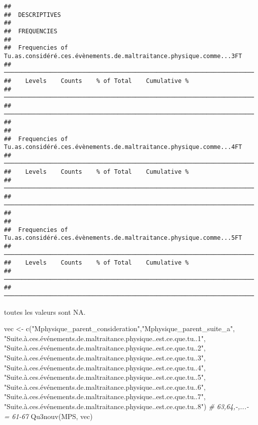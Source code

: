 \documentclass[
]{article}
\newenvironment{Shaded}{\begin{snugshade}}{\end{snugshade}}
\newcommand{\CommentTok}[1]{\textcolor[rgb]{0.56,0.35,0.01}{\textit{#1}}}
\newcommand{\FunctionTok}[1]{\textcolor[rgb]{0.00,0.00,0.00}{#1}}
\newcommand{\NormalTok}[1]{#1}
\newcommand{\OtherTok}[1]{\textcolor[rgb]{0.56,0.35,0.01}{#1}}
\newcommand{\StringTok}[1]{\textcolor[rgb]{0.31,0.60,0.02}{#1}}
\begin{document}
\begin{verbatim}
## 
##  DESCRIPTIVES
## 
##  FREQUENCIES
## 
##  Frequencies of Tu.as.considéré.ces.évènements.de.maltraitance.physique.comme...3FT 
##  ────────────────────────────────────────────────────────────────────────────────── 
##    Levels    Counts    % of Total    Cumulative %   
##  ────────────────────────────────────────────────────────────────────────────────── 
##  ────────────────────────────────────────────────────────────────────────────────── 
## 
## 
##  Frequencies of Tu.as.considéré.ces.évènements.de.maltraitance.physique.comme...4FT 
##  ────────────────────────────────────────────────────────────────────────────────── 
##    Levels    Counts    % of Total    Cumulative %   
##  ────────────────────────────────────────────────────────────────────────────────── 
##  ────────────────────────────────────────────────────────────────────────────────── 
## 
## 
##  Frequencies of Tu.as.considéré.ces.évènements.de.maltraitance.physique.comme...5FT 
##  ────────────────────────────────────────────────────────────────────────────────── 
##    Levels    Counts    % of Total    Cumulative %   
##  ────────────────────────────────────────────────────────────────────────────────── 
##  ──────────────────────────────────────────────────────────────────────────────────
\end{verbatim}

toutes les valeurs sont NA.

\begin{Shaded}
\begin{Highlighting}[]
\NormalTok{vec }\OtherTok{\textless{}{-}} \FunctionTok{c}\NormalTok{(}\StringTok{"Mphysique\_parent\_consideration"}\NormalTok{,}\StringTok{"Mphysique\_parent\_suite\_a"}\NormalTok{,}
         \StringTok{"Suite.à.ces.événements.de.maltraitance.physique..est.ce.que.tu..1"}\NormalTok{,}
         \StringTok{"Suite.à.ces.événements.de.maltraitance.physique..est.ce.que.tu..2"}\NormalTok{,}
         \StringTok{"Suite.à.ces.événements.de.maltraitance.physique..est.ce.que.tu..3"}\NormalTok{,}
         \StringTok{"Suite.à.ces.événements.de.maltraitance.physique..est.ce.que.tu..4"}\NormalTok{,}
         \StringTok{"Suite.à.ces.événements.de.maltraitance.physique..est.ce.que.tu..5"}\NormalTok{,}
         \StringTok{"Suite.à.ces.événements.de.maltraitance.physique..est.ce.que.tu..6"}\NormalTok{,}
         \StringTok{"Suite.à.ces.événements.de.maltraitance.physique..est.ce.que.tu..7"}\NormalTok{,}
         \StringTok{"Suite.à.ces.événements.de.maltraitance.physique..est.ce.que.tu..8"}\NormalTok{)}
\CommentTok{\# 63,64,{-},...{-} = 61{-}67}
\FunctionTok{Qu3nouv}\NormalTok{(MPS, vec)}
\end{Highlighting}
\end{Shaded}
\end{document}
